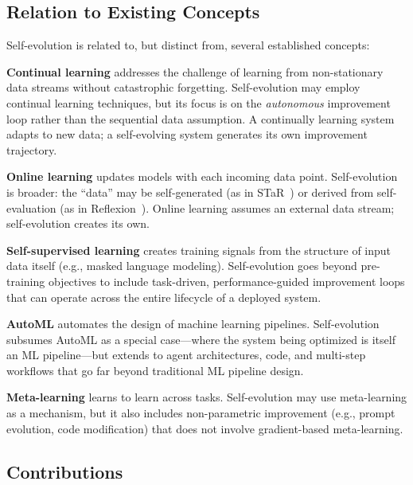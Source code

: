 \documentclass[11pt,a4paper]{article}
\begin{document}
\subsection{Relation to Existing Concepts}

Self-evolution is related to, but distinct from, several established concepts:

\textbf{Continual learning} addresses the challenge of learning from non-stationary data streams without catastrophic forgetting. Self-evolution may employ continual learning techniques, but its focus is on the \emph{autonomous} improvement loop rather than the sequential data assumption. A continually learning system adapts to new data; a self-evolving system generates its own improvement trajectory.

\textbf{Online learning} updates models with each incoming data point. Self-evolution is broader: the ``data'' may be self-generated (as in STaR~\citep{zelikman2022star}) or derived from self-evaluation (as in Reflexion~\citep{shinn2023reflexion}). Online learning assumes an external data stream; self-evolution creates its own.

\textbf{Self-supervised learning} creates training signals from the structure of input data itself (e.g., masked language modeling). Self-evolution goes beyond pre-training objectives to include task-driven, performance-guided improvement loops that can operate across the entire lifecycle of a deployed system.

\textbf{AutoML} automates the design of machine learning pipelines. Self-evolution subsumes AutoML as a special case---where the system being optimized is itself an ML pipeline---but extends to agent architectures, code, and multi-step workflows that go far beyond traditional ML pipeline design.

\textbf{Meta-learning} learns to learn across tasks. Self-evolution may use meta-learning as a mechanism, but it also includes non-parametric improvement (e.g., prompt evolution, code modification) that does not involve gradient-based meta-learning.

\subsection{Contributions}
\end{document}
